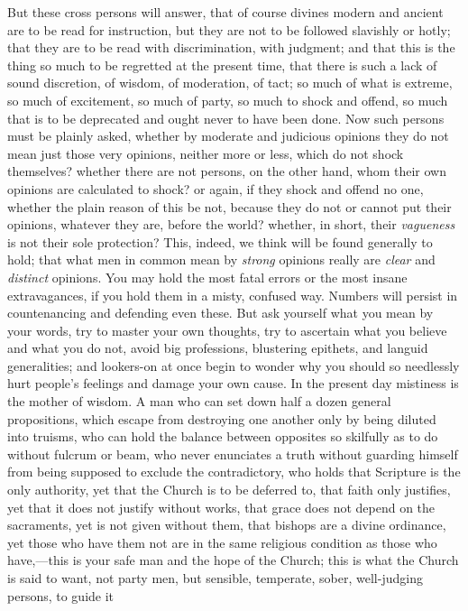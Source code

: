 But these cross persons will answer, that of
course divines modern and ancient are to be read for instruction, but
they are not to be followed slavishly or hotly; that they are to be
read with discrimination, with judgment; and that this is the thing so
much to be regretted at the present time, that there is such a lack of
sound discretion, of wisdom, of moderation, of tact; so much of what
is extreme, so much of excitement, so much of party, so much to shock
and offend, so much that is to be deprecated and ought never to have
been done. Now such persons must be plainly asked, whether by moderate
and judicious opinions they do not mean just those very opinions,
neither more or less, which do not shock themselves? whether there are
not persons, on the other hand, whom their own opinions are calculated
to shock? or again, if they shock and offend no one, whether the plain
reason of this be not, because they do not or cannot put their
opinions, whatever they are, before the world? whether, in short,
their \emph{vagueness} is not their sole protection? This, indeed, we
think will be found generally to hold; that what men in common mean by
\emph{strong} opinions really are \emph{clear} and \emph{distinct}
opinions. You may hold the most fatal errors or the most insane
extravagances, if you hold them in a misty, confused way. Numbers will
persist in countenancing and defending even these. But ask yourself
what you mean by your words, try to master your own thoughts, try to
ascertain what you believe and what you do not, avoid big professions,
blustering epithets, and languid generalities; and lookers-on at
once begin to wonder why you should so needlessly hurt people's
feelings and damage your own cause. In the present day mistiness is
the mother of wisdom. A man who can set down half a dozen general
propositions, which escape from destroying one another only by being
diluted into truisms, who can hold the balance between opposites so
skilfully as to do without fulcrum or beam, who never enunciates a
truth without guarding himself from being supposed to exclude the
contradictory, who holds that Scripture is the only authority, yet
that the Church is to be deferred to, that faith only justifies, yet
that it does not justify without works, that grace does not depend on
the sacraments, yet is not given without them, that bishops are a
divine ordinance, yet those who have them not are in the same
religious condition as those who have,—this is your safe man and the
hope of the Church; this is what the Church is said to want, not party
men, but sensible, temperate, sober, well-judging persons, to guide it
